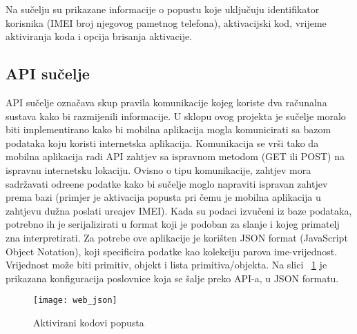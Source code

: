 Na su\v{c}elju su prikazane informacije o popustu koje uklju\v{c}uju identifikator korisnika (IMEI broj njegovog pametnog telefona), aktivacijski kod, vrijeme aktiviranja koda i opcija brisanja aktivacije.

\subsection{API su\v{c}elje}

API su\v{c}elje ozna\v{c}ava skup pravila komunikacije kojeg koriste dva ra\v{c}unalna sustava kako bi razmijenili informacije. U sklopu ovog projekta je su\v{c}elje moralo biti implementirano kako bi mobilna aplikacija mogla komunicirati sa bazom podataka koju koristi internetska aplikacija. Komunikacija se vr\v{s}i tako da mobilna aplikacija radi API zahtjev sa ispravnom metodom (GET ili POST) na ispravnu internetsku lokaciju. Ovisno o tipu komunikacije, zahtjev mora sadr\v{z}avati odre\dj ene podatke kako bi su\v{c}elje moglo napraviti ispravan zahtjev prema bazi (primjer je aktivacija popusta pri \v{c}emu je mobilna aplikacija u zahtjevu du\v{z}na poslati ure\dj ajev IMEI). Kada su podaci izvu\v{c}eni iz baze podataka, potrebno ih je serijalizirati u format koji je podoban za slanje i kojeg primatelj zna interpretirati. Za potrebe ove aplikacije je kori\v{s}ten JSON format \cite{json} (JavaScript Object Notation), koji specificira podatke kao kolekciju parova ime-vrijednost. Vrijednost mo\v{z}e biti primitiv, objekt i lista primitiva/objekta. Na slici ~\ref{fig:web_json} je prikazana konfiguracija poslovnice koja se \v{s}alje preko API-a, u JSON formatu.


\begin{figure}[!htbp]
	\begin{center}
 \texttt{[image: web\_json]}
 \caption{Aktivirani kodovi popusta}
 \label{fig:web_json}
	\end{center}
\end{figure}

